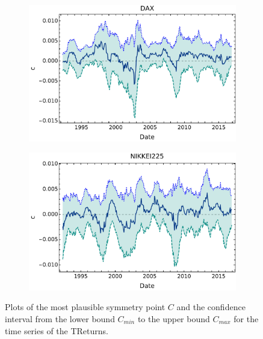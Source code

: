 \documentclass{elsarticle}
\begin{document}
\begin{figure}[h!tb]
\begin{subfigure}[b]{0.44\textwidth}
            \includegraphics[width=\textwidth]{figures/SimmTReturns/Simetria_DAX_CL005.pdf}
            \label{fig:SymmTReturns005DAX}
            \end{subfigure}
        \quad
        \begin{subfigure}[b]{0.44\textwidth}
            \centering 
            \includegraphics[width=\textwidth]{figures/SimmTReturns/Simetria_NIKKEI_CL005.pdf}
            \label{fig:SymmTReturns005Nikkei}
        \end{subfigure}
        \caption[Plots of the most plausible symmetry point $C$ and the confidence interval TReturns]
        {\small Plots of the most plausible symmetry point $C$ and the confidence interval from the lower bound $C_{min}$ to the upper bound $C_{max}$ for the time series of the TReturns.} 
        \label{fig:SymmTReturns005}
\end{figure}
\end{document}
